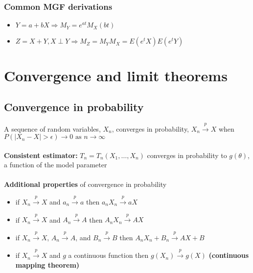 \documentclass{article}
\newcommand{\abs}[1]{\lvert#1\rvert}
\begin{document}
\subsubsection{Common MGF derivations}
\begin{itemize}
    \item $Y = a+bX \Longrightarrow M_Y = e^{at}M_X(bt)$
    \item $Z = X+Y, X \perp Y \Longrightarrow M_Z = M_YM_X = E(e^tX)E(e^tY)$
\end{itemize}


\section{Convergence and limit theorems}
\subsection{Convergence in probability}
A sequence of random variables, $X_n$, converges in probability, $X_n \overset{p}{\longrightarrow} X$ when
$P(\abs{X_n - X} > \epsilon) \longrightarrow 0 \textrm{ as } n \longrightarrow \infty$\\\\
\textbf{Consistent estimator:} $T_n = T_n(X_1, \dots, X_n)$ converges in probability to $g(\theta)$, a function of the model parameter\\\\
\textbf{Additional properties} of convergence in probability
\begin{itemize}
    \item if $X_n \overset{p}{\longrightarrow} X$ and $a_n \overset{p}{\longrightarrow} a$ then $a_nX_n \overset{p}{\longrightarrow} aX$
    \item if $X_n \overset{p}{\longrightarrow} X$ and $A_n \overset{p}{\longrightarrow} A$ then $A_nX_n \overset{p}{\longrightarrow} AX$
    \item if $X_n \overset{p}{\longrightarrow} X$, $A_n \overset{p}{\longrightarrow} A$, and $B_n \overset{p}{\longrightarrow} B$ then $A_nX_n + B_n \overset{p}{\longrightarrow} AX + B$
    \item if $X_n \overset{p}{\longrightarrow} X$ and $g$ a continuous function then $g(X_n) \overset{p}{\longrightarrow} g(X)$ \textbf{(continuous mapping theorem)}
\end{itemize}
\end{document}
